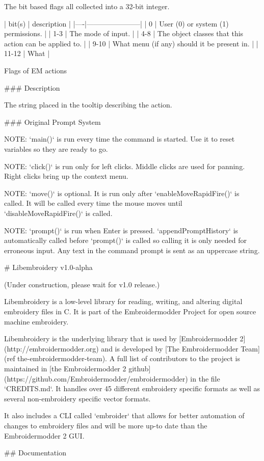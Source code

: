 The bit based flags all collected into a 32-bit integer.

| bit(s) | description |
|----|-----------------------|
| 0 | User (0) or system (1) permissions. |
| 1-3 | The mode of input. |
| 4-8 | The object classes that this action can be applied to. |
| 9-10 | What menu (if any) should it be present in. |
| 11-12 | What |

\caption{Flags of EM actions}

### Description

The string placed in the tooltip describing the action.

### Original Prompt System

NOTE: `main()` is run every time the command is started.
Use it to reset variables so they are ready to go.

NOTE: `click()` is run only for left clicks.
Middle clicks are used for panning.
Right clicks bring up the context menu.

NOTE: `move()` is optional. It is run only after
`enableMoveRapidFire()` is called. It
will be called every time the mouse moves until
`disableMoveRapidFire()` is called.

NOTE: `prompt()` is run when Enter is pressed.
`appendPromptHistory` is automatically called before `prompt()`
is called so calling it is only needed for erroneous input.
Any text in the command prompt is sent as an uppercase string.

# Libembroidery v1.0-alpha

(Under construction, please wait for v1.0 release.)

Libembroidery is a low-level library for reading, writing, 
and altering digital embroidery files in C. It is part of the Embroidermodder Project
for open source machine embroidery.

Libembroidery is the underlying library that is used by [Embroidermodder 2](http://embroidermodder.org)
and is developed by [The Embroidermodder Team](ref the-embroidermodder-team).
A full list of contributors to the project is maintained in
[the Embroidermodder 2 github](https://github.com/Embroidermodder/embroidermodder)
in the file `CREDITS.md`.
It handles over 45 different embroidery specific formats as well
as several non-embroidery specific vector formats.

It also includes a CLI called `embroider` that allows for better automation of
changes to embroidery files and will be more up-to date than
the Embroidermodder 2 GUI.

## Documentation

